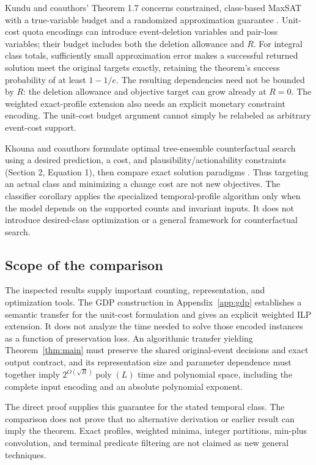 \documentclass[11pt]{article}
\theoremstyle{remark}
\newcommand{\poly}{\operatorname{poly}}
\begin{document}
Kundu and coauthors' Theorem 1.7 concerns constrained, class-based MaxSAT with a true-variable
budget and a randomized approximation guarantee \citep{kundu2026}. Unit-cost
quota encodings can introduce event-deletion variables and pair-loss variables;
their budget includes both the deletion allowance and $R$. For integral
class totals, sufficiently small approximation error makes a successful
returned solution meet the original targets exactly, retaining the theorem's
success probability of at least $1-1/e$. The resulting dependencies need not
be bounded by $R$: the deletion allowance and objective target can grow already
at $R=0$. The weighted exact-profile extension also needs an explicit monetary
constraint encoding. The unit-cost budget argument cannot simply be relabeled
as arbitrary event-cost support.

Khouna and coauthors formulate optimal tree-ensemble counterfactual search
using a desired prediction, a cost, and plausibility/actionability constraints
(Section 2, Equation 1), then compare exact solution paradigms
\citep{khouna2026}. Thus targeting an actual class and minimizing a change cost
are not new objectives. The classifier corollary applies the specialized temporal-profile algorithm
only when the model depends on the supported counts and invariant inputs.
It does not introduce desired-class optimization or a general framework for
counterfactual search.


\subsection{Scope of the comparison}

The inspected results supply important counting, representation, and
optimization tools. The GDP construction in Appendix~\ref{app:gdp}
establishes a semantic transfer for the unit-cost formulation and gives an
explicit weighted ILP extension. It does not analyze the time needed to
solve those encoded instances as a function of preservation loss.
An algorithmic transfer yielding Theorem~\ref{thm:main} must preserve the
shared original-event decisions and exact output contract, and its
representation size and parameter dependence must together imply
$2^{O(\sqrt R)}\poly(L)$ time and polynomial space, including the complete
input encoding and an absolute polynomial exponent.

The direct proof supplies this guarantee for the stated temporal class.
The comparison does not prove that no alternative derivation or earlier
result can imply the theorem. Exact profiles, weighted minima, integer
partitions, min-plus convolution, and terminal predicate filtering are not
claimed as new general techniques.
\end{document}
